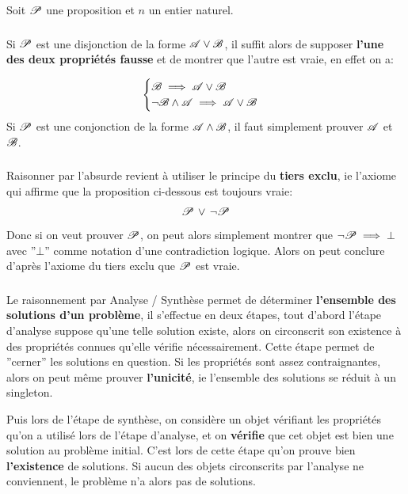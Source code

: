 \chapter*{}
Soit \(\P\) une proposition et \(n\) un entier naturel.

\subsection*{}
Si \(\P\) est une disjonction de la forme \(\A \lor \B\), il suffit alors de supposer \textbf{l'une des deux propriétés fausse} et de montrer que l'autre est vraie, en effet on a:

\[
   \begin{cases}
      \B \implies \A \lor \B \\
      \lnot \B \land \A \implies \A \lor \B&
   \end{cases} 
\]
Si \(\P\) est une conjonction de la forme \(\A \land \B\), il faut simplement prouver \(\A\) et \(\B\).
\subsection*{}
Raisonner par l'absurde revient à utiliser le principe du \textbf{tiers exclu}, ie l'axiome qui affirme que la proposition ci-dessous est toujours vraie:
\[
   \P \, \lor \, \lnot \P
\]
Donc si on veut prouver \(\P\), on peut alors simplement montrer que \(\lnot\P \implies \bot\) avec ''\(\bot\)'' comme notation d'une contradiction logique. Alors on peut conclure d'après l'axiome du tiers exclu que \(\P\) est vraie. 
\subsection*{}
Le raisonnement par Analyse / Synthèse permet de déterminer \textbf{l'ensemble des solutions d'un problème}, il s'effectue en deux étapes, tout d'abord l'étape d'analyse suppose qu'une telle solution existe, alors on circonscrit son existence à des propriétés connues qu'elle vérifie nécessairement. Cette étape permet de ''cerner'' les solutions en question. Si les propriétés sont assez contraignantes, alors on peut même prouver \textbf{l'unicité}, ie l'ensemble des solutions se réduit à un singleton.\<

Puis lors de l'étape de synthèse, on considère un objet vérifiant les propriétés qu'on a utilisé lors de l'étape d'analyse, et on \textbf{vérifie} que cet objet est bien une solution au problème initial. C'est lors de cette étape qu'on prouve bien \textbf{l'existence} de solutions. Si aucun des objets circonscrits par l'analyse ne conviennent, le problème n'a alors pas de solutions.
